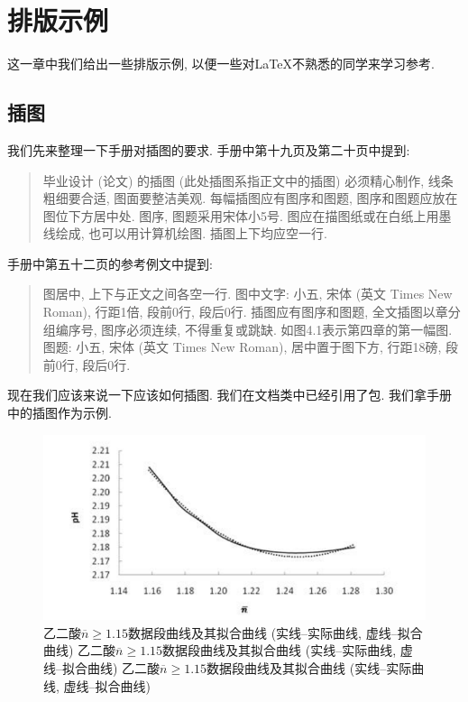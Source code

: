 
\section{排版示例}

这一章中我们给出一些排版示例, 以便一些对\LaTeX 不熟悉的同学来学习参考.

\clearpage
\subsection{插图}

我们先来整理一下手册对插图的要求. 手册中第十九页及第二十页中提到:
\begin{quote}
  毕业设计 (论文) 的插图 (此处插图系指正文中的插图) 必须精心制作, 线条粗细要合适, 图面要整洁美观. 每幅插图应有图序和图题, 图序和图题应放在图位下方居中处. 图序, 图题采用宋体小5号. 图应在描图纸或在白纸上用墨线绘成, 也可以用计算机绘图. 插图上下均应空一行.
\end{quote}
手册中第五十二页的参考例文中提到:
\begin{quote}
  图居中, 上下与正文之间各空一行.
  图中文字: 小五, 宋体 (英文 Times New Roman), 行距1倍, 段前0行, 段后0行.
  插图应有图序和图题, 全文插图以章分组编序号, 图序必须连续, 不得重复或跳缺. 如图4.1表示第四章的第一幅图.
  图题: 小五, 宋体 (英文 Times New Roman), 居中置于图下方, 行距18磅, 段前0行, 段后0行.
\end{quote}

现在我们应该来说一下应该如何插图. 我们在文档类中已经引用了包. 我们拿手册中的插图作为示例.

\begin{figure}[htb]
  \centering
  \includegraphics{figures/oxalic-acid-n-geq-1.15.pdf}
  \caption{乙二酸$\overline{n}\geq 1.15$数据段曲线及其拟合曲线 (实线--实际曲线, 虚线--拟合曲线) 乙二酸$\overline{n}\geq 1.15$数据段曲线及其拟合曲线 (实线--实际曲线, 虚线--拟合曲线) 乙二酸$\overline{n}\geq 1.15$数据段曲线及其拟合曲线 (实线--实际曲线, 虚线--拟合曲线)}
\end{figure}

\zhlipsum[1]
